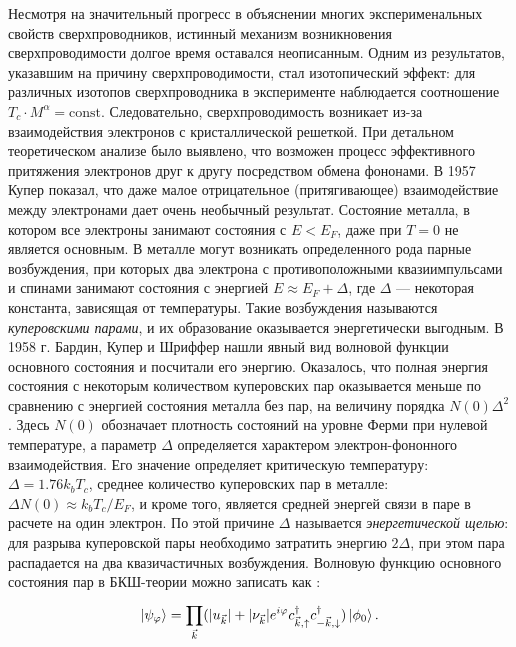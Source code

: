 Несмотря на значительный прогресс в объяснении многих эксперименальных свойств сверхпроводников, истинный механизм возникновения сверхпроводимости долгое время оставался неописанным. Одним из результатов, указавшим на причину сверхпроводимости, стал изотопический эффект: для различных изотопов сверхпроводника в эксперименте наблюдается соотношение $T_c \cdot M^{\alpha}=\text{const}$. Следовательно, сверхпроводимость возникает из-за взаимодействия электронов с кристаллической решеткой. При детальном теоретическом анализе было выявлено, что возможен процесс эффективного притяжения электронов друг к другу посредством обмена фононами. В 1957 Купер \cite{CooperPairs} показал, что даже малое отрицательное (притягивающее) взаимодействие между электронами дает очень необычный результат. Состояние металла, в котором все электроны занимают состояния с $E<E_F$, даже при $T=0$ не является основным. В металле могут возникать определенного рода парные возбуждения, при которых два электрона с противоположными квазиимпульсами и спинами занимают состояния с энергией $E\approx E_F\! +\! \Delta$, где $\Delta$ --- некоторая константа, зависящая от температуры. Такие возбуждения называются \textit{куперовскими парами}, и их образование оказывается энергетически выгодным.  В 1958 г. Бардин, Купер и Шриффер \cite{Bardeen} нашли явный вид волновой функции основного состояния  и посчитали его энергию. Оказалось, что полная энергия состояния с некоторым количеством куперовских пар оказывается меньше по сравнению с энергией состояния металла без пар, на величину порядка $N(0)\Delta^2$. Здесь $N(0)$ обозначает плотность состояний на уровне Ферми при нулевой температуре, а параметр $\Delta$ определяется характером электрон-фононного взаимодействия. Его значение определяет критическую температуру: $\Delta = 1.76 k_b T_c$, среднее количество куперовских пар в металле: $\Delta N(0) \approx k_b T_c/E_F$, и кроме того, является средней энергей связи в паре в расчете на один электрон. По этой причине $\Delta$ называется \textit{энергетической щелью}: для разрыва куперовской пары необходимо затратить энергию $2\Delta$, при этом пара распадается на два квазичастичных возбуждения. Волновую функцию основного состояния пар в БКШ-теории можно записать как \cite{Tinkham}:
\begin{equation}
\ket{\psi_\varphi} = \prod_{\vec{k}}^{}(|u_{\vec{k}}|+|\nu_{\vec{k}}|e^{i\varphi}c^\dag_{\vec{k},\uparrow}c^\dagger_{-\vec{k}, \downarrow})\ket{\phi_0}.
\end{equation}  
